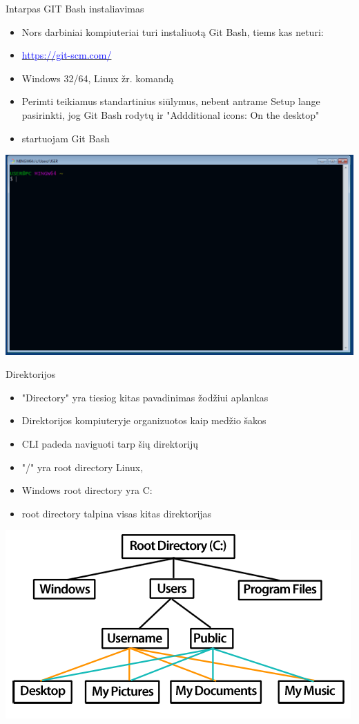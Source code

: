 \documentclass[11pt,xcolor=table]{beamer}
\begin{document}
\begin{frame}{Intarpas GIT Bash instaliavimas}
\begin{itemize}
\item Nors darbiniai kompiuteriai turi instaliuotą Git Bash, tiems kas neturi:
\item \href{https://git-scm.com/}{\textcolor{blue}{https://git-scm.com/}}
\item Windows 32/64, Linux žr. komandą
\item Perimti teikiamus standartinius siūlymus, nebent antrame Setup lange pasirinkti, jog Git Bash rodytų ir "Addditional icons: On the desktop"
\item startuojam Git Bash
\end{itemize}
\center
\includegraphics[scale=0.15]{Git_Bash_1.png}
\end{frame}
\begin{frame}{Direktorijos}
\begin{itemize}
\item "Directory" yra tiesiog kitas pavadinimas žodžiui aplankas
\item Direktorijos kompiuteryje organizuotos kaip medžio šakos
\item CLI padeda naviguoti tarp šių direktorijų
\item "/" yra root directory Linux, 
\item Windows root directory yra C:
\item root directory talpina visas kitas direktorijas
\end{itemize}
\center
\includegraphics[scale=1.5]{diagram_directory_win.png}
\end{frame}
\end{document}
